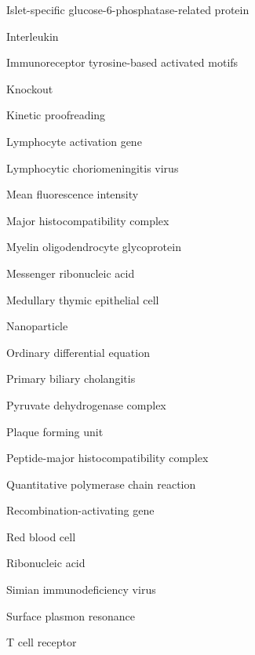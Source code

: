  \tabto{5.5em} Islet-specific glucose-6-phosphatase-related protein

 \tabto{5.5em} Interleukin

 \tabto{5.5em} Immunoreceptor tyrosine-based activated motifs

 \tabto{5.5em} Knockout

 \tabto{5.5em} Kinetic proofreading

 \tabto{5.5em} Lymphocyte activation gene

 \tabto{5.5em} Lymphocytic choriomeningitis virus

 \tabto{5.5em} Mean fluorescence intensity

 \tabto{5.5em} Major histocompatibility complex

 \tabto{5.5em} Myelin oligodendrocyte glycoprotein

 \tabto{5.5em} Messenger ribonucleic acid

 \tabto{5.5em} Medullary thymic epithelial cell

 \tabto{5.5em} Nanoparticle

 \tabto{5.5em} Ordinary differential equation

 \tabto{5.5em} Primary biliary cholangitis

 \tabto{5.5em} Pyruvate dehydrogenase complex

 \tabto{5.5em} Plaque forming unit

 \tabto{5.5em} Peptide-major histocompatibility complex

 \tabto{5.5em} Quantitative polymerase chain reaction

 \tabto{5.5em} Recombination-activating gene

 \tabto{5.5em} Red blood cell


 \tabto{5.5em} Ribonucleic acid

 \tabto{5.5em} Simian immunodeficiency virus

 \tabto{5.5em} Surface plasmon resonance

 \tabto{5.5em} T cell receptor

